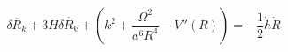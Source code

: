 \begin{equation}\label{perturbationeq}
\delta \ddot{R_k}+3H\delta
\dot{R_k}+(k^2+\frac{\Omega^2}{a^6R^4}-V''(R))=-\frac{1}{2}\dot{h}\dot{R}
\end{equation}

